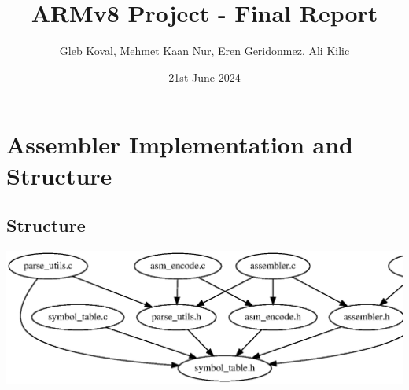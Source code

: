 \documentclass[11pt]{article}
\begin{document}
\title{\vspace{-1in}ARMv8 Project - Final Report}
\author {Gleb Koval, Mehmet Kaan Nur, Eren Geridonmez, Ali Kilic}
\date {21st June 2024}
\maketitle
\section{Assembler Implementation and Structure}
\subsection{Structure}

\includegraphics[width=\textwidth]{incgraph_assemble.eps}
\end{document}

